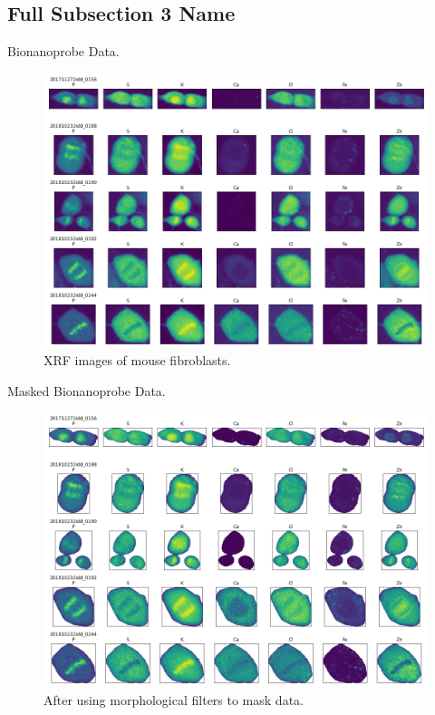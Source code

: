 \documentclass[
]{beamer}
\begin{document}
\subsection[Short Subsection 3 Name]{Full Subsection 3 Name}

\begin{frame}{Bionanoprobe Data.}
\begin{figure}[h]
  \includegraphics[width=1\textwidth,height=.7\textheight,keepaspectratio]{unmasked.png}
  \caption{XRF images of mouse fibroblasts.
  }
\end{figure}
\end{frame}

\begin{frame}{Masked Bionanoprobe Data.}
\begin{figure}[h]
  \includegraphics[width=1\textwidth,height=.7\textheight,keepaspectratio]{masked.png}
  \caption{After using morphological filters to mask data.
  }
\end{figure}
\end{frame}
\end{document}

